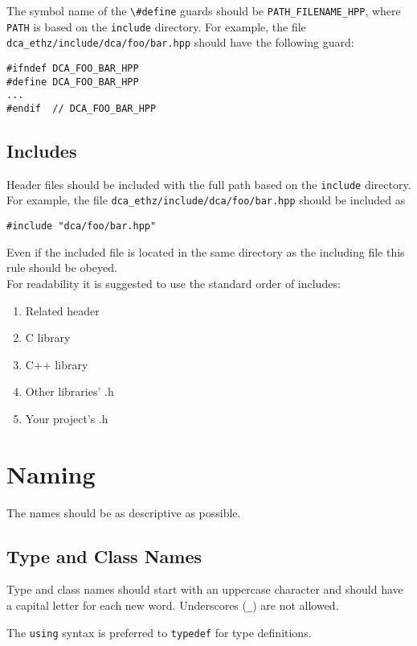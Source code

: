 \documentclass[a4paper]{article}
\newcommand{\inlinecode}[1]{\lstinline|#1|}
\begin{document}
The symbol name of the \inlinecode{\#define} guards should be \inlinecode{PATH_FILENAME_HPP}, where \inlinecode{PATH} is based on the \verb|include| directory. For example, the file\\ \verb|dca_ethz/include/dca/foo/bar.hpp| should have the following guard:

\begin{lstlisting}
#ifndef DCA_FOO_BAR_HPP
#define DCA_FOO_BAR_HPP
...
#endif  // DCA_FOO_BAR_HPP
\end{lstlisting}

\subsection{Includes}
Header files should be included with the full path based on the \verb|include| directory. For example, the file \verb|dca_ethz/include/dca/foo/bar.hpp| should be included as
\begin{lstlisting}
#include "dca/foo/bar.hpp"
\end{lstlisting}
Even if the included file is located in the same directory as the including file this rule should be obeyed. \\

For readability it is suggested to use the standard order of includes:
\begin{enumerate}
	\item Related header
	\item C library
	\item C++ library
	\item Other libraries' .h
	\item Your project's .h
\end{enumerate}
\section{Naming}

The names should be as descriptive as possible.

\subsection{Type and Class Names}

Type and class names should start with an uppercase character and should have a capital letter for each new word. Underscores (\inlinecode{_}) are not allowed.

The \inlinecode{using} syntax is preferred to \inlinecode{typedef} for type definitions.
\end{document}
